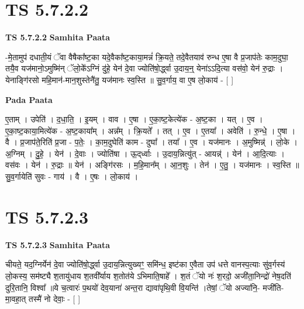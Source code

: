 \documentclass[17pt]{extarticle}
\begin{document}
\section*{ TS 5.7.2.2 }

\textbf{TS 5.7.2.2 } \newline
\textbf{Samhita Paata} \newline

-मे॒तामुप॑ दधाती॒यं ॅवा वैषैका᳚ष्ट॒का यदे॒वैका᳚ष्ट॒काया॒मन्नं॑ क्रि॒यते॒ तदे॒वैतयाव॑ रुन्ध ए॒षा वै प्र॒जाप॑तेः काम॒दुघा॒ तयै॒व यज॑मानो॒ऽमुष्मि॑न् ॅलो॒के᳚ऽग्निं दु॑हे॒ येन॑ दे॒वा ज्योति॑षो॒र्द्ध्वा उ॒दाय॒न्॒ येना॑ऽऽदि॒त्या वस॑वो॒ येन॑ रु॒द्राः । येनाङ्गि॑रसो महि॒मान॑-मान॒शुस्तेनै॑तु॒ यज॑मानः स्व॒स्ति ॥ सु॒व॒र्गाय॒ वा ए॒ष लो॒काय॑ - [  ] \newline

\textbf{Pada Paata} \newline

ए॒ताम् । उपेति॑ । द॒धा॒ति॒ । इ॒यम् । वाव । ए॒षा । ए॒का॒ष्ट॒केत्ये॑क - अ॒ष्ट॒का । यत् । ए॒व । ए॒का॒ष्ट॒काया॒मित्ये॑क - अ॒ष्ट॒काया᳚म् । अन्न᳚म् । क्रि॒यते᳚ । तत् । ए॒व । ए॒तया᳚ । अवेति॑ । रु॒न्धे॒ । ए॒षा । वै । प्र॒जाप॑ते॒रिति॑ प्र॒जा - प॒तेः॒ । का॒म॒दुघेति॑ काम - दुघा᳚ । तया᳚ । ए॒व । यज॑मानः । अ॒मुष्मिन्न्॑ । लो॒के । अ॒ग्निम् । दु॒हे॒ । येन॑ । दे॒वाः । ज्योति॑षा । ऊ॒द्‌र्ध्वाः । उ॒दाय॒न्नित्यु॑त् - आयन्न्॑ । येन॑ । आ॒दि॒त्याः । वस॑वः । येन॑ । रु॒द्राः ॥ येन॑ । अङ्गि॑रसः । म॒हि॒मान᳚म् । आ॒न॒शुः । तेन॑ । ए॒तु॒ । यज॑मानः । स्व॒स्ति ॥ सु॒व॒र्गायेति॑ सुवः - गाय॑ । वै । ए॒षः । लो॒काय॑ ।  \newline




\section*{ TS 5.7.2.3 }

\textbf{TS 5.7.2.3 } \newline
\textbf{Samhita Paata} \newline

चीयते॒ यद॒ग्निर्येन॑ दे॒वा ज्योति॑षो॒र्द्ध्वा उ॒दाय॒न्नित्युख्यꣳ॒॒ समि॑न्ध॒  इष्ट॑का ए॒वैता उप॑ धत्ते वानस्प॒त्याः सु॑व॒र्गस्य॑ लो॒कस्य॒ सम॑ष्ट्यै श॒तायु॑धाय श॒तवी᳚र्याय श॒तोत॑ये ऽभिमाति॒षाहे᳚ । श॒तं ॅयो नः॑ श॒रदो॒ अजी॑ता॒निन्द्रो॑ नेष॒दति॑ दुरि॒तानि॒ विश्वा᳚ ॥ये च॒त्वारः॑ प॒थयो॑ देव॒याना॑ अन्त॒रा द्यावा॑पृथि॒वी वि॒यन्ति॑ ।तेषां॒ ॅयो अज्या॑नि॒- मजी॑ति-मा॒वहा॒त् तस्मै॑ नो देवाः॒ - [  ] \newline
\end{document}
